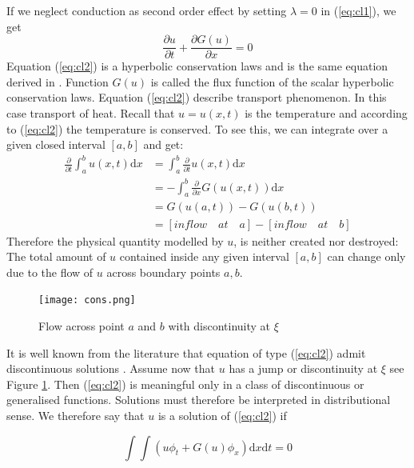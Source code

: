 If we neglect conduction as second order effect by setting $\lambda=0$ in (\ref{eq:cl1}), we get 
\begin{equation}\label{eq:cl2}
\frac{\partial u}{\partial t} +\frac{ \partial G(u) }{\partial x}=0						       
\end{equation}
Equation (\ref{eq:cl2}) is a hyperbolic conservation laws and is the same equation derived in \cite{Waj05}. Function $G(u)$ is called the flux function of the scalar hyperbolic conservation laws. Equation (\ref{eq:cl2}) describe transport phenomenon. In this case transport of heat. Recall that $u=u(x,t)$ is the temperature and according to (\ref{eq:cl2}) the temperature is conserved. To see this, we can integrate over a given closed interval $[a,b]$ and get:
\begin{align}
\frac{\partial}{\partial t}\int_{a}^{b}u(x,t)\mathrm{d}x &=\int_{a}^{b}\frac{\partial}{\partial t}u(x,t)\mathrm{d}x\\
									      &=-\int_{a}^{b}\frac{ \partial }{\partial x}G(u(x,t))\mathrm{d}x\\
									      &=G(u(a,t))-G(u(b,t))\\
									      &=[inflow\quad at\quad a]-[inflow\quad at\quad b]
\end{align}
 Therefore the physical quantity modelled by $u$, is neither created nor destroyed: The total amount of $u$ contained inside any given interval $[a,b]$ can change only due to the flow of $u$ across boundary points $a, b$.
 \begin{figure}[H] %
    \centering
    \texttt{[image: cons.png]} 
    \caption{Flow across point $a$ and $b$ with discontinuity at $\xi$}
    \label{fig:flow}
 \end{figure}
 
It is well known from the literature that equation of type (\ref{eq:cl2})  admit discontinuous solutions \cite{Risebro07}. Assume now that $u$ has a jump or discontinuity at $\xi$ see Figure \ref{fig:flow}. Then (\ref{eq:cl2}) is meaningful only in a class of discontinuous or generalised functions. Solutions must therefore be interpreted in distributional sense.
We therefore say that $u$ is a solution of (\ref{eq:cl2}) if

\begin{equation}\label{eq:weak}
\int\int( u\phi_{t}+G(u)\phi_{x})\mathrm{d}x\mathrm{d}t = 0
\end{equation}


